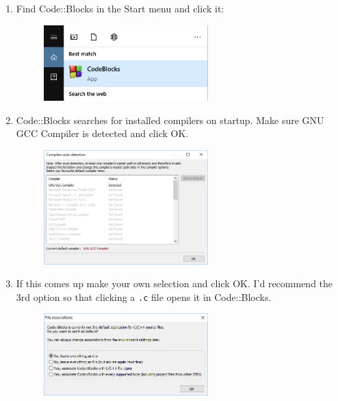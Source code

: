 \documentclass{lab}
\begin{document}
\begin{enumerate}
\item Find Code::Blocks in the Start menu and click it:

\begin{figure}[H]
\begin{center}
\includegraphics[width=0.6\textwidth]{Wk1Images/cbstart}
\end{center}
\end{figure}

\item Code::Blocks searches for installed compilers on startup. Make sure GNU GCC Compiler is detected and click OK.

\begin{figure}[H]
\begin{center}
\includegraphics[width=0.6\textwidth]{Wk1Images/cb0.png}
\end{center}
\end{figure}

\item If this comes up make your own selection and click OK. I'd recommend the 3rd option so that clicking a \texttt{.c} file opens it in Code::Blocks.

\begin{figure}[H]
\begin{center}
\includegraphics[width=0.6\textwidth]{Wk1Images/cb0b}
\end{center}
\end{figure}


\end{enumerate}
\end{document}
